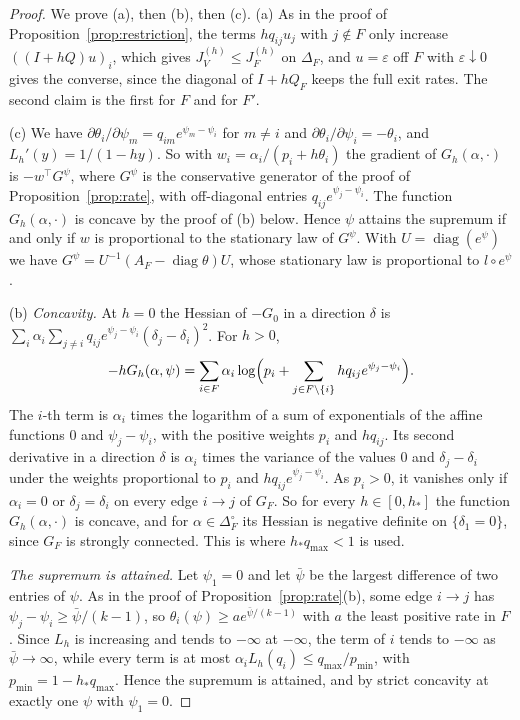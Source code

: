 \begin{proof}
We prove (a), then (b), then (c). (a) As in the proof of Proposition~\ref{prop:restriction}, the terms
$hq_{ij}u_j$ with $j\notin F$ only increase $((I+hQ)u)_i$, which gives
$J^{(h)}_V\le J^{(h)}_F$ on $\Delta_F$, and $u=\varepsilon$ off $F$ with
$\varepsilon\downarrow0$ gives the converse, since the diagonal of $I+hQ_F$ keeps
the full exit rates. The second claim is the first for $F$ and for $F'$.

(c) We have $\partial\theta_i/\partial\psi_m=q_{im}e^{\psi_m-\psi_i}$ for
$m\ne i$ and $\partial\theta_i/\partial\psi_i=-\theta_i$, and
$L_h'(y)=1/(1-hy)$. So with $w_i=\alpha_i/(p_i+h\theta_i)$ the gradient of
$G_h(\alpha,\cdot)$ is $-w^\top G^\psi$, where $G^\psi$ is the conservative
generator of the proof of Proposition~\ref{prop:rate}, with off-diagonal entries
$q_{ij}e^{\psi_j-\psi_i}$. The function $G_h(\alpha,\cdot)$ is concave by the
proof of (b) below. Hence $\psi$ attains the supremum if and only if $w$ is
proportional to the stationary law of $G^\psi$. With
$U=\operatorname{diag}(e^\psi)$ we have
$G^\psi=U^{-1}(A_F-\operatorname{diag}\theta)U$, whose stationary law is
proportional to $l\circ e^\psi$.

(b) \emph{Concavity.} At $h=0$ the Hessian of $-G_0$ in a direction $\delta$ is
$\sum_i\alpha_i\sum_{j\ne i}q_{ij}e^{\psi_j-\psi_i}(\delta_j-\delta_i)^2$. For
$h>0$,
\[
 -hG_h(\alpha,\psi)=\sum_{i\in F}\alpha_i
 \log\Bigl(p_i+\sum_{j\in F\setminus\{i\}}hq_{ij}e^{\psi_j-\psi_i}\Bigr).
\]
The $i$-th term is $\alpha_i$ times the logarithm of a sum of exponentials of
the affine functions $0$ and $\psi_j-\psi_i$, with the positive weights $p_i$ and
$hq_{ij}$. Its second derivative in a direction $\delta$ is $\alpha_i$ times the
variance of the values $0$ and $\delta_j-\delta_i$ under the weights
proportional to $p_i$ and $hq_{ij}e^{\psi_j-\psi_i}$. As $p_i>0$, it vanishes
only if $\alpha_i=0$ or $\delta_j=\delta_i$ on every edge $i\to j$ of $G_F$. So
for every $h\in[0,h_*]$ the function $G_h(\alpha,\cdot)$ is concave, and for
$\alpha\in\Delta_F^\circ$ its Hessian is negative definite on $\{\delta_1=0\}$,
since $G_F$ is strongly connected. This is where $h_*q_{\max}<1$ is used.

\emph{The supremum is attained.} Let $\psi_1=0$ and let $\bar\psi$ be the
largest difference of two entries of $\psi$. As in the proof of
Proposition~\ref{prop:rate}(b), some edge $i\to j$ has
$\psi_j-\psi_i\ge\bar\psi/(k-1)$, so $\theta_i(\psi)\ge ae^{\bar\psi/(k-1)}$ with
$a$ the least positive rate in $F$. Since $L_h$ is increasing and tends to
$-\infty$ at $-\infty$, the term of $i$ tends to $-\infty$ as $\bar\psi\to\infty$,
while every term is at most $\alpha_iL_h(q_i)\le q_{\max}/p_{\min}$, with
$p_{\min}=1-h_*q_{\max}$. Hence the supremum is attained, and by strict concavity at
exactly one $\psi$ with $\psi_1=0$.


\end{proof}

